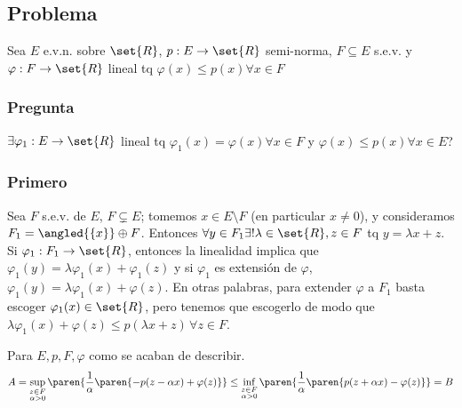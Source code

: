 \documentclass{notetaking}
\begin{document}
\subsection{Problema}
Sea \(E\) e.v.n. sobre \(\set{R}\), \(p:E\rightarrow\set{R}\) semi-norma, \(F\subseteq E\) s.e.v. y \(\varphi:F\rightarrow\set{R}\) lineal tq \(\varphi(x)\leq p(x)\forall x\in F\)

\subsubsection{Pregunta}
\(\exists\varphi_1:E\rightarrow\set{R}\) lineal tq \(\varphi_1(x)=\varphi(x)\forall x\in F\) y \(\varphi(x)\leq p(x)\forall x\in E\)?

\subsubsection{Primero}
Sea \(F\) s.e.v. de \(E\), \(F\subsetneq E\); tomemos \(x\in E\setminus F\) (en particular \(x\neq0\)), y consideramos \(F_1=\angled{\{x\}}\oplus F\). Entonces \(\forall y\in F_1\exists!\lambda\in\set{R},z\in F\) tq \(y=\lambda x+ z\). Si \(\varphi_1:F_1\rightarrow\set{R}\), entonces la linealidad implica que \(\varphi_1(y)=\lambda\varphi_1(x)+\varphi_1(z)\) y si \(\varphi_1\) es extensión de \(\varphi\), \(\varphi_1(y)=\lambda\varphi_1(x)+\varphi(z)\). En otras palabras, para extender \(\varphi\) a \(F_1\) basta escoger \(\varphi_1(x)\in\set{R}\), pero tenemos que escogerlo de modo que \(\lambda\varphi_1(x)+\varphi(z)\leq p(\lambda x+z)\,\forall z\in F\).
\begin{lem}
    Para \(E,p,F,\varphi\) como se acaban de describir.
    \[
        A=\sup_{\substack{z\in F\\\alpha>0}}\paren{\frac1\alpha\paren{-p(z-\alpha x)+\varphi(z)}}\leq\inf_{\substack{z\in F\\\alpha>0}}\paren{\frac1\alpha\paren{p(z+\alpha x)-\varphi(z)}}=B
    \]
\end{lem}
\end{document}
